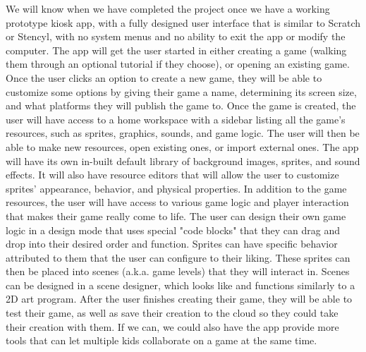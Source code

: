 \documentclass[10pt,draftclsnofoot,onecolumn,letterpaper]{IEEEtran}
\begin{document}
We will know when we have completed the project once we have a working prototype kiosk app, with a fully designed user interface that is similar to Scratch or Stencyl, with no system menus and no ability to exit the app or modify the computer. The app will get the user started in either creating a game (walking them through an optional tutorial if they choose), or opening an existing game. Once the user clicks an option to create a new game, they will be able to customize some options by giving their game a name, determining its screen size, and what platforms they will publish the game to. Once the game is created, the user will have access to a home workspace with a sidebar listing all the game's resources, such as sprites, graphics, sounds, and game logic. The user will then be able to make new resources, open existing ones, or import external ones. The app will have its own in-built default library of background images, sprites, and sound effects. It will also have resource editors that will allow the user to customize sprites' appearance, behavior, and physical properties. In addition to the game resources, the user will have access to various game logic and player interaction that makes their game really come to life. The user can design their own game logic in a design mode that uses special "code blocks" that they can drag and drop into their desired order and function. Sprites can have specific behavior attributed to them that the user can configure to their liking. These sprites can then be placed into scenes (a.k.a. game levels) that they will interact in. Scenes can be designed in a scene designer, which looks like and functions similarly to a 2D art program. After the user finishes creating their game, they will be able to test their game, as well as save their creation to the cloud so they could take their creation with them. If we can, we could also have the app provide more tools that can let multiple kids collaborate on a game at the same time.
\end{document}
